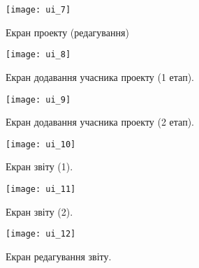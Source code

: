 \begin{figure}[H]
	\centering
	\texttt{[image: ui\_7]}
	\caption{Екран проекту (редагування)}
	\label{scr_ui_project_edit}
\end{figure}

\begin{figure}[H]
	\centering
	\texttt{[image: ui\_8]}
	\caption{Екран додавання учасника проекту (1 етап).}
	\label{scr_ui_add_project_members_1}
\end{figure}

\begin{figure}[H]
	\centering
	\texttt{[image: ui\_9]}
	\caption{Екран додавання учасника проекту (2 етап).}
	\label{scr_ui_add_project_members_2}
\end{figure}

\begin{figure}[H]
	\centering
	\texttt{[image: ui\_10]}
	\caption{Екран звіту (1).}
	\label{scr_ui_issue_1}
\end{figure}

\begin{figure}[H]
	\centering
	\texttt{[image: ui\_11]}
	\caption{Екран звіту (2).}
	\label{scr_ui_issue_2}
\end{figure}

\begin{figure}[H]
	\centering
	\texttt{[image: ui\_12]}
	\caption{Екран редагування звіту.}
	\label{scr_ui_issue_edit}
\end{figure}